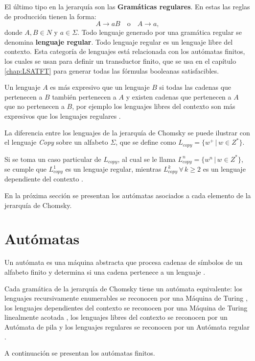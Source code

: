 \documentclass[12pt]{article}
\begin{document}
El último tipo en la jerarquía son las \textbf{Gramáticas regulares}. En estas las reglas de producción tienen la forma:
\[
  A \to aB \quad \text{o} \quad A \to a,
\]
donde \(A, B \in N\) y \(a \in \Sigma\).
Todo lenguaje generado por una gramática regular se denomina \textbf{lenguaje regular}.
Todo lenguaje regular es un lenguaje libre del contexto. Esta categoría de lenguajes está relacionada con los autómatas
finitos, los cuales se usan para definir un transductor finito, que se usa en el capítulo \ref{chap:LSATFT} para 
generar todas las fórmulas booleanas satisfacibles.

Un lenguaje $A$ es más expresivo que un lenguaje $B$ si todas las cadenas que pertenecen a $B$ también pertenecen a $A$ y existen cadenas 
que pertenecen a $A$ que no pertenecen a $B$, por ejemplo los lenguajes libres del contexto son más expresivos que los lenguajes regulares \cite{authomataTheory}. 

La diferencia entre los lenguajes de la jerarquía de Chomsky se puede ilustrar con el lenguaje \textit{Copy} sobre un alfabeto $\Sigma$, que se define como 
$L_{copy}=\{w^+\,|\,w\in Z^*\}$. 

Si se toma un caso particular de $L_{copy}$, al cual se le llama $L_{copy}^n=\{w^n\,|\,w\in Z^*\}$, se cumple que 
$L_{copy}^1$ es un lenguaje regular, mientras $L_{copy}^k\,\forall\,k\geq 2$ es un lenguaje dependiente del contexto \cite{authomataTheory}. 

En la próxima sección se presentan los autómatas asociados a cada elemento de la jerarquía de Chomsky. 

\section{Autómatas}

Un autómata es una máquina abstracta que procesa cadenas de símbolos de un alfabeto finito y determina si una 
cadena pertenece a un lenguaje \cite{authomataTheory}.

Cada gramática de la jerarquía de Chomsky tiene un autómata equivalente: los lenguajes recursivamente enumerables se reconocen por una Máquina de Turing \cite{authomataTheory}, los lenguajes dependientes del contexto se reconocen por una Máquina de Turing linealmente acotada \cite{authomataTheory}, los lenguajes libres del contexto se reconocen por un Autómata de pila \cite{authomataTheory} y los lenguajes regulares se reconocen por un Autómata regular \cite{authomataTheory}.

A continuación se presentan los autómatas finitos.
\end{document}
